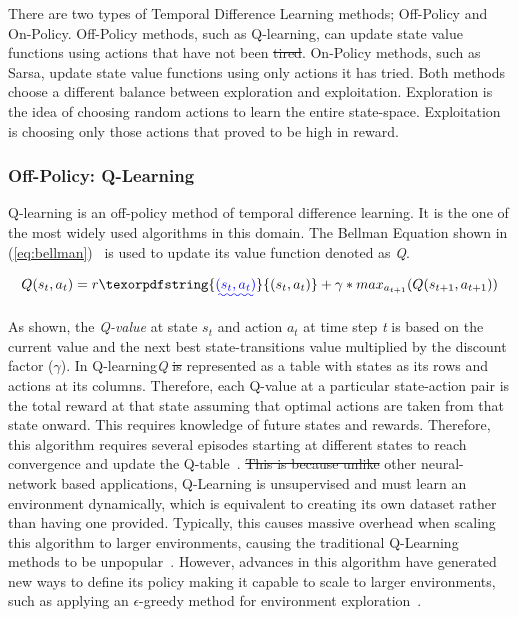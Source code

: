 \documentclass[12pt,american]{report}
\providecommand{\DIFaddtex}[1]{{\protect\color{blue}\uwave{#1}}} %
\providecommand{\DIFdeltex}[1]{{\protect\color{red}\sout{#1}}}                      %
\providecommand{\DIFaddbegin}{} %
\providecommand{\DIFaddend}{} %
\providecommand{\DIFdelbegin}{} %
\providecommand{\DIFdelend}{} %
\providecommand{\DIFadd}[1]{\texorpdfstring{\DIFaddtex{#1}}{#1}} %
\providecommand{\DIFdel}[1]{\texorpdfstring{\DIFdeltex{#1}}{}} %
\newcommand{\DIFscaledelfig}{0.5}
\newlength{\DIFdelgraphicswidth} %
\newlength{\DIFdelgraphicsheight} %
\newcommand{\DIFaddincludegraphics}[2][]{{\color{blue}\fbox{\DIFOincludegraphics[#1]{#2}}}} %
\newcommand{\DIFdelincludegraphics}[2][]{%
\sbox{\DIFdelgraphicsbox}{\DIFOincludegraphics[#1]{#2}}%
\settoboxwidth{\DIFdelgraphicswidth}{\DIFdelgraphicsbox} %
\settoboxtotalheight{\DIFdelgraphicsheight}{\DIFdelgraphicsbox} %
\scalebox{\DIFscaledelfig}{%
\parbox[b]{\DIFdelgraphicswidth}{\usebox{\DIFdelgraphicsbox}\\[-\baselineskip] \rule{\DIFdelgraphicswidth}{0em}}\llap{\resizebox{\DIFdelgraphicswidth}{\DIFdelgraphicsheight}{%
\setlength{\unitlength}{\DIFdelgraphicswidth}%
\begin{picture}(1,1)%
\thicklines\linethickness{2pt} %
{\color[rgb]{1,0,0}\put(0,0){\framebox(1,1){}}}%
{\color[rgb]{1,0,0}\put(0,0){\line( 1,1){1}}}%
{\color[rgb]{1,0,0}\put(0,1){\line(1,-1){1}}}%
\end{picture}%
}\hspace*{3pt}}} %
} %
\DeclareRobustCommand{\DIFaddbegin}{\DIFOaddbegin \let\includegraphics\DIFaddincludegraphics} %
\DeclareRobustCommand{\DIFaddend}{\DIFOaddend \let\includegraphics\DIFOincludegraphics} %
\DeclareRobustCommand{\DIFdelbegin}{\DIFOdelbegin \let\includegraphics\DIFdelincludegraphics} %
\DeclareRobustCommand{\DIFdelend}{\DIFOaddend \let\includegraphics\DIFOincludegraphics} %
\begin{document}
There are two types of Temporal Difference Learning methods; Off-Policy and On-Policy. Off-Policy methods, such as Q-learning, can update state value functions using actions that have not been \DIFdelbegin \DIFdel{tired}\DIFdelend \DIFaddbegin \DIFadd{tried}\DIFaddend . On-Policy methods, such as Sarsa, update state value functions using only actions it has tried.  Both methods choose a different balance between exploration and exploitation.  Exploration is the idea of choosing random actions to learn the entire state-space.  Exploitation is choosing only those actions that proved to be high in reward.

        
\subsubsection{Off-Policy: Q-Learning}
        Q-learning is an off-policy method of temporal difference learning. It is the one of the most widely used algorithms in this domain. The Bellman Equation shown in (\ref{eq:bellman})~\cite{matiisen_2015} is used to update its value function denoted as \textit{Q}.

        \begin{equation}
            \label{eq:bellman}
            Q(s_{t},a_{t}) = r\DIFaddbegin \DIFadd{(s_{t},a_{t}) }\DIFaddend + \gamma*max_{a_{t+1} }(Q(s_{t+1},a_{t+1}))
        \end{equation}

        As shown, the \textit{Q-value} at state \textit{$s_t$} and action \textit{$a_t$} at time step \textit{t} is based on the current value and the next best state-transitions value multiplied by the discount factor ($\gamma$). In Q-learning\DIFaddbegin \DIFadd{, the }\DIFaddend \textit{Q\DIFaddbegin \DIFadd{(s,a)}\DIFaddend } \DIFdelbegin \DIFdel{is }\DIFdelend \DIFaddbegin \DIFadd{values are }\DIFaddend represented as a table with states as its rows and actions at its columns.  Therefore, each Q-value at a particular state-action pair is the total reward at that state assuming that optimal actions are taken from that state onward.  This requires knowledge of future states and rewards.  Therefore, this algorithm requires several episodes starting at different states to reach convergence and update the Q-table~\cite{Watkins:1992}. \DIFdelbegin \DIFdel{This is because unlike }\DIFdelend \DIFaddbegin \DIFadd{Unlike }\DIFaddend other neural-network based applications, Q-Learning is unsupervised and must learn an environment dynamically, which is equivalent to creating its own dataset rather than having one provided. Typically, this causes massive overhead when scaling this algorithm to larger environments, causing the traditional Q-Learning methods to be unpopular~\cite{peng2015mobile}.  However, advances in this algorithm have generated new ways to define its policy making it capable to scale to larger environments, such as applying an $\epsilon$-greedy method for environment exploration~\cite{Greedy}. 
\end{document}
